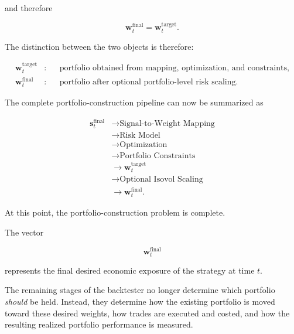 \documentclass[11pt,a4paper]{article}
\begin{document}
and therefore

\begin{equation}
\boxed{
\mathbf{w}_t^{\mathrm{final}}
=
\mathbf{w}_t^{\mathrm{target}}.
}
\end{equation}

The distinction between the two objects is therefore:

\begin{equation}
\boxed{
\begin{aligned}
\mathbf{w}_t^{\mathrm{target}}
&:
&&
\text{portfolio obtained from mapping, optimization, and constraints},
\\
\mathbf{w}_t^{\mathrm{final}}
&:
&&
\text{portfolio after optional portfolio-level risk scaling}.
\end{aligned}
}
\end{equation}

The complete portfolio-construction pipeline can now be summarized as

\begin{equation}
\boxed{
\begin{aligned}
\mathbf{s}_t^{\mathrm{final}}
&\rightarrow
\text{Signal-to-Weight Mapping}
\\
&\rightarrow
\text{Risk Model}
\\
&\rightarrow
\text{Optimization}
\\
&\rightarrow
\text{Portfolio Constraints}
\\
&\rightarrow
\mathbf{w}_t^{\mathrm{target}}
\\
&\rightarrow
\text{Optional Isovol Scaling}
\\
&\rightarrow
\mathbf{w}_t^{\mathrm{final}}.
\end{aligned}
}
\end{equation}

At this point, the portfolio-construction problem is complete.

The vector

\begin{equation}
\boxed{
\mathbf{w}_t^{\mathrm{final}}
}
\end{equation}

represents the final desired economic exposure of the strategy at time $t$.

The remaining stages of the backtester no longer determine which portfolio
\emph{should} be held. Instead, they determine how the existing portfolio is
moved toward these desired weights, how trades are executed and costed, and how
the resulting realized portfolio performance is measured.
\end{document}
